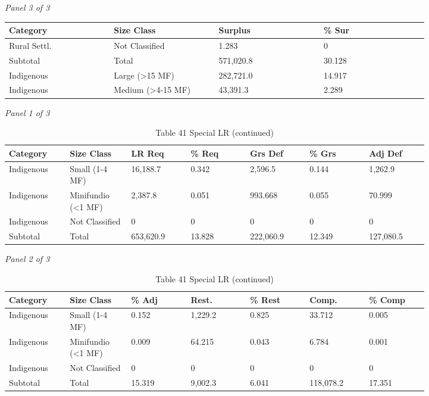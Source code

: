 \documentclass[12pt]{article}
\begin{document}
\begin{landscape}
\begin{table}[H]
\vspace{0.6em}

\textit{Panel 3 of 3}\\[2pt]
{\fontsize{12}{14}\selectfont
\setlength{\tabcolsep}{3pt}
\renewcommand{\arraystretch}{1.08}
\begin{tabular}{p{0.205\linewidth}p{0.205\linewidth}p{0.205\linewidth}p{0.205\linewidth}}
\toprule
Category & Size Class & Surplus & \% Sur \\
\midrule
Rural Settl. & Not Classified & 1.283 & 0 \\
Subtotal & Total & 571,020.8 & 30.128 \\
Indigenous & Large (>15 MF) & 282,721.0 & 14.917 \\
Indigenous & Medium (>4-15 MF) & 43,391.3 & 2.289 \\
\bottomrule
\end{tabular}
}
\end{table}
\begin{table}[H]
\centering
\caption{Table 41 Special LR (continued)}
\textit{Panel 1 of 3}\\[2pt]
{\fontsize{12}{14}\selectfont
\setlength{\tabcolsep}{3pt}
\renewcommand{\arraystretch}{1.08}
\begin{tabular}{p{0.117\linewidth}p{0.117\linewidth}p{0.117\linewidth}p{0.117\linewidth}p{0.117\linewidth}p{0.117\linewidth}p{0.117\linewidth}}
\toprule
Category & Size Class & LR Req & \% Req & Grs Def & \% Grs & Adj Def \\
\midrule
Indigenous & Small (1-4 MF) & 16,188.7 & 0.342 & 2,596.5 & 0.144 & 1,262.9 \\
Indigenous & Minifundio (<1 MF) & 2,387.8 & 0.051 & 993.668 & 0.055 & 70.999 \\
Indigenous & Not Classified & 0 & 0 & 0 & 0 & 0 \\
Subtotal & Total & 653,620.9 & 13.828 & 222,060.9 & 12.349 & 127,080.5 \\
\bottomrule
\end{tabular}
}

\vspace{0.6em}

\textit{Panel 2 of 3}\\[2pt]
{\fontsize{12}{14}\selectfont
\setlength{\tabcolsep}{3pt}
\renewcommand{\arraystretch}{1.08}
\begin{tabular}{p{0.117\linewidth}p{0.117\linewidth}p{0.117\linewidth}p{0.117\linewidth}p{0.117\linewidth}p{0.117\linewidth}p{0.117\linewidth}}
\toprule
Category & Size Class & \% Adj & Rest. & \% Rest & Comp. & \% Comp \\
\midrule
Indigenous & Small (1-4 MF) & 0.152 & 1,229.2 & 0.825 & 33.712 & 0.005 \\
Indigenous & Minifundio (<1 MF) & 0.009 & 64.215 & 0.043 & 6.784 & 0.001 \\
Indigenous & Not Classified & 0 & 0 & 0 & 0 & 0 \\
Subtotal & Total & 15.319 & 9,002.3 & 6.041 & 118,078.2 & 17.351 \\
\bottomrule
\end{tabular}
}


\end{table}
\end{landscape}
\end{document}
